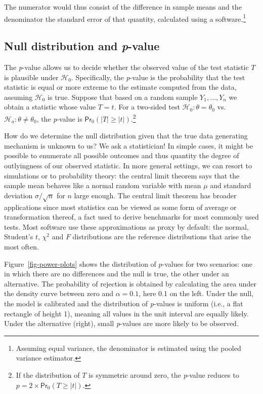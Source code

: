 \documentclass[
  11pt,
  letterpaper,
]{scrbook}
\theoremstyle{definition}
\theoremstyle{remark}
\begin{document}
The numerator would thus consist of the difference in sample means and
the denominator the standard error of that quantity, calculated using a
software.\footnote{Assuming equal variance, the denominator is estimated
  using the pooled variance estimator.}

\hypertarget{null-distribution-and-p-value}{%
\subsection{\texorpdfstring{Null distribution and
\emph{p}-value}{Null distribution and p-value}}\label{null-distribution-and-p-value}}

The \emph{p}-value allows us to decide whether the observed value of the
test statistic \(T\) is plausible under \(\mathscr{H}_0\). Specifically,
the \emph{p}-value is the probability that the test statistic is equal
or more extreme to the estimate computed from the data, assuming
\(\mathscr{H}_0\) is true. Suppose that based on a random sample
\(Y_1, \ldots, Y_n\) we obtain a statistic whose value \(T=t\). For a
two-sided test \(\mathscr{H}_0:\theta=\theta_0\)
vs.~\(\mathscr{H}_a:\theta \neq \theta_0\), the \emph{p}-value is
\(\mathsf{Pr}_0(|T| \geq |t|)\).\footnote{If the distribution of \(T\)
  is symmetric around zero, the \emph{p}-value reduces to
  \(p = 2 \times \mathsf{Pr}_0(T \geq |t|).\)}

How do we determine the null distribution given that the true data
generating mechanism is unknown to us? We ask a statistician! In simple
cases, it might be possible to enumerate all possible outcomes and thus
quantity the degree of outlyingness of our observed statistic. In more
general settings, we can resort to simulations or to probability theory:
the central limit theorem says that the sample mean behaves like a
normal random variable with mean \(\mu\) and standard deviation
\(\sigma/\sqrt{n}\) for \(n\) large enough. The central limit theorem
has broader applications since most statistics can be viewed as some
form of average or transformation thereof, a fact used to derive
benchmarks for most commonly used tests. Most software use these
approximations as proxy by default: the normal, Student's \(t\),
\(\chi^2\) and \(F\) distributions are the reference distributions that
arise the most often.

Figure~\ref{fig-power-plots} shows the distribution of \(p\)-values for
two scenarios: one in which there are no differences and the null is
true, the other under an alternative. The probability of rejection is
obtained by calculating the area under the density curve between zero
and \(\alpha=0.1\), here 0.1 on the left. Under the null, the model is
calibrated and the distribution of \emph{p}-values is uniform (i.e., a
flat rectangle of height 1), meaning all values in the unit interval are
equally likely. Under the alternative (right), small \emph{p}-values are
more likely to be observed.
\end{document}
